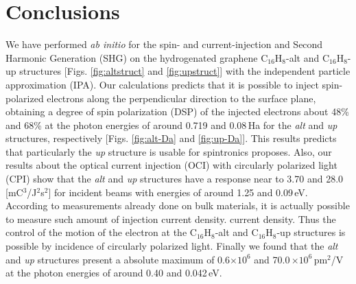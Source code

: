 \documentclass[aps,pra,11pt,tightenlines,showpacs,superscriptaddress,groupedaddress]{revtex4-1}
\newcommand{\altstc}{C$_{16}$H$_{8}$-alt}
\newcommand{\upstc}{C$_{16}$H$_{8}$-up}
\begin{document}

\section{Conclusions} %
\label{sec:conclusions}

We have performed \emph{ab initio} for the spin- and  current-injection and
Second Harmonic Generation (SHG) on the hydrogenated graphene {\altstc} and
{\upstc} structures [Figs. \ref{fig:altstruct} and \ref{fig:upstruct}] with the
independent particle approximation (IPA). Our calculations predicts that it is
possible to inject spin-polarized electrons along the perpendicular direction
to the surface plane, obtaining a degree of spin polarization (DSP) of the
injected electrons about 48\% and 68\% at the photon energies of around 0.719
and 0.08\,Ha  for the \emph{alt} and \emph{up} structures, respectively [Figs.
\ref{fig:alt-Da} and \ref{fig:up-Da}]. This results predicts that particularly
the \emph{up} structure is usable for spintronics proposes. Also, our results
about the optical current injection (OCI) with circularly polarized light (CPI)
show that the \emph{alt}  and \emph{up} structures have a response near to 3.70
and 28.0\,[mC$^{3}$/J$^{2}$s$^{2}$] for incident beams with energies of around
1.25 and 0.09\,eV. According to measurements already done on bulk materials, it
is actually possible to measure such amount of injection current density.
current density. Thus the control of the motion of the electron at the
{\altstc} and {\upstc} structures is possible by incidence of circularly
polarized light. Finally we found that the \emph{alt} and \emph{up} structures
present a absolute maximum of 0.6$\times 10^{6}$ and 70.0\,$\times 10^{6}
$\,pm$^{2}$/V at the photon energies of around 0.40 and 0.042\,eV.



\end{document}
